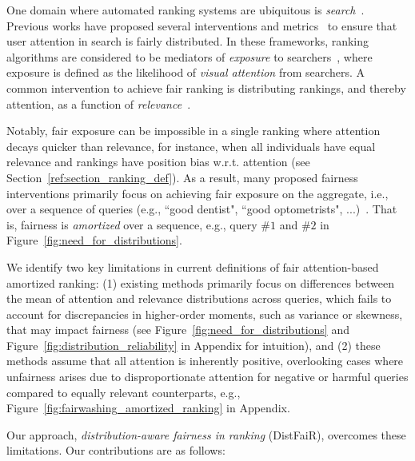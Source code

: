 One domain where automated ranking systems are ubiquitous is {\em search}~\cite{altman2005ranking}. Previous works have proposed several interventions and metrics~\cite{beutel2019fairness,naghiaei2022cpfair} to ensure that user attention in search is fairly distributed. In these frameworks, ranking algorithms are considered to be mediators of \emph{exposure} to searchers~\cite{joachims2021recommendations,schnabel2016recommendations}, where exposure is defined as the likelihood of \emph{visual attention} from searchers. A common intervention to achieve fair ranking is distributing rankings, and thereby attention, as a function of \emph{relevance}~\cite{singh2018fairness, biega2018equity}. 

Notably, fair exposure can be impossible in a single ranking where attention decays quicker than relevance, for instance, when all individuals have equal relevance and rankings have position bias w.r.t. attention (see Section~\ref{ref:section_ranking_def}). As a result, many proposed fairness interventions primarily focus on achieving fair exposure on the aggregate, i.e., over a sequence of queries (e.g., {``good dentist", ``good optometrists", ...})~\cite{biega2018equity,singh2018fairness}. That is, fairness is \emph{amortized} over a sequence, e.g., query $\#1$ and $\#2$ in Figure~\ref{fig:need_for_distributions}.



We identify two key limitations in current definitions of fair attention-based amortized ranking: (1) existing methods primarily focus on differences between the mean of attention and relevance distributions across queries, which fails to account for discrepancies in higher-order moments, such as variance or skewness, that may impact fairness (see Figure~\ref{fig:need_for_distributions} and Figure~\ref{fig:distribution_reliability} in Appendix for intuition), and (2) these methods assume that all attention is inherently positive, overlooking cases where unfairness arises due to disproportionate attention for negative or harmful queries compared to equally relevant counterparts, e.g., Figure~\ref{fig:fairwashing_amortized_ranking} in Appendix. 

Our approach, {\em distribution-aware fairness in ranking} (DistFaiR), overcomes these limitations. Our contributions are as follows:
\vspace{-1.05em}


